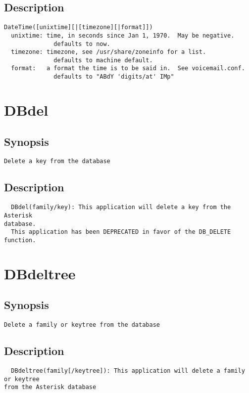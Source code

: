 \subsection{Description}
\begin{verbatim}
DateTime([unixtime][|[timezone][|format]])
  unixtime: time, in seconds since Jan 1, 1970.  May be negative.
              defaults to now.
  timezone: timezone, see /usr/share/zoneinfo for a list.
              defaults to machine default.
  format:   a format the time is to be said in.  See voicemail.conf.
              defaults to "ABdY 'digits/at' IMp"

\end{verbatim}


\section{DBdel}
\subsection{Synopsis}
\begin{verbatim}
Delete a key from the database
\end{verbatim}
\subsection{Description}
\begin{verbatim}
  DBdel(family/key): This application will delete a key from the Asterisk
database.
  This application has been DEPRECATED in favor of the DB_DELETE function.

\end{verbatim}


\section{DBdeltree}
\subsection{Synopsis}
\begin{verbatim}
Delete a family or keytree from the database
\end{verbatim}
\subsection{Description}
\begin{verbatim}
  DBdeltree(family[/keytree]): This application will delete a family or keytree
from the Asterisk database

\end{verbatim}


